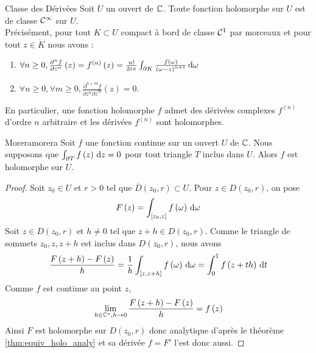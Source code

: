 \documentclass{cours}
\begin{document}
\begin{corollaire}{Classe des Dérivées}{}
    Soit $U$ un ouvert de $\mathbb{C}$. Toute fonction holomorphe sur $U$ est de classe $\mathcal{C}^{\infty}$ sur $U$.\\
    Précisément, pour tout $K \subset U$ compact à bord de classe $\mathcal{C}^{1}$ par morceaux et pour tout $z \in \mathring{K}$ nous avons : 
    \begin{enumerate}
        \item $\forall n \geq 0, \frac{\partial^{n}f}{\partial z^{n}}\left(z\right) = f^{\left(n\right)}\left(z\right) = \frac{n!}{2i\pi}\int_{\partial K}\frac{f\left(\omega\right)}{\left(\omega - z\right)^{n + 1}}{\rm \, d} \omega$
        \item $\forall n \geq 0, \forall m \geq 0, \frac{\partial^{n + m}f}{\partial z^{n}\partial \bar{z}^{m}}\left(z\right) = 0$.
    \end{enumerate}
    En particulier, une fonction holomorphe $f$ admet des dérivées complexes $f^{\left(n\right)}$ d'ordre $n$ arbitraire et les dérivées $f^{\left(n\right)}$ sont holomorphes.
\end{corollaire}

\begin{théorème}{Morera}{morera}
    Soit $f$ une fonction continue sur un ouvert $U$ de $\mathbb{C}$. Nous supposons que $\int_{\partial T}f\left(z\right) {\rm \, d} z = 0$ pour tout triangle $T$ inclus dans $U$. Alors $f$ est holomorphe sur $U$.
\end{théorème}
\begin{proof}
    Soit $z_{0} \in U$ et $r > 0$ tel que $\overline{D}\left(z_{0}, r\right) \subset U$. Pour $z \in D\left(z_{0}, r\right)$, on pose 
    \begin{equation*}
        F\left(z\right) = \int_{\left[z_{0}, z\right]} f\left(\omega\right) {\rm \, d} \omega
    \end{equation*}
    Soit $z \in D\left(z_{0}, r\right)$ et $h \neq 0$ tel que $z + h \in D\left(z_{0}, r\right)$. Comme le triangle de sommets $z_{0}, z, z + h$ est inclus dans $D\left(z_{0}, r\right)$, nous avons 
    \begin{equation*}
        \frac{F\left(z + h\right)-F\left(z\right)}{h} = \frac{1}{h}\int_{\left[z, z + h\right]}f\left(\omega\right){\rm \, d} \omega = \int_{0}^{1} f\left(z + th\right){\rm \, d} t
    \end{equation*}
    Comme $f$ est continue au point $z$, 
    \begin{equation*}
        \lim_{h \in \mathbb{C}^{*}, h \to 0} \frac{F\left(z + h\right) - F\left(z\right)}{h} = f\left(z\right)
    \end{equation*}
    Ainsi $F$ est holomorphe sur $D\left(z_{0}, r\right)$ donc analytique d'après le théorème \ref{thm:equiv_holo_analy} et sa dérivée $f = F'$ l'est donc aussi.
\end{proof}
\end{document}
